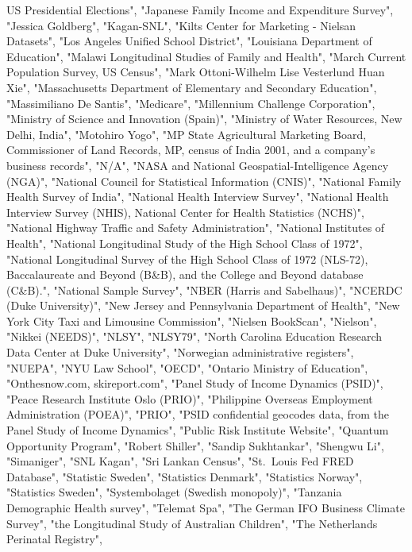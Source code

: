 \documentclass[]{article}
\begin{document}
\begin{itemize}
  US Presidential Elections", "Japanese Family Income and Expenditure
  Survey", "Jessica Goldberg", "Kagan-SNL", "Kilts Center for Marketing
  - Nielsan Datasets", "Los Angeles Unified School District", "Louisiana
  Department of Education", "Malawi Longitudinal Studies of Family and
  Health", "March Current Population Survey, US Census", "Mark
  Ottoni-Wilhelm Lise Vesterlund Huan Xie", "Massachusetts Department of
  Elementary and Secondary Education", "Massimiliano De Santis",
  "Medicare", "Millennium Challenge Corporation", "Ministry of Science
  and Innovation (Spain)", "Ministry of Water Resources, New Delhi,
  India", "Motohiro Yogo", "MP State Agricultural Marketing Board,
  Commissioner of Land Records, MP, census of India 2001, and a
  company's business records", "N/A", "NASA and National
  Geospatial-Intelligence Agency (NGA)", "National Council for
  Statistical Information (CNIS)", "National Family Health Survey of
  India", "National Health Interview Survey", "National Health Interview
  Survey (NHIS), National Center for Health Statistics (NCHS)",
  "National Highway Traffic and Safety Administration", "National
  Institutes of Health", "National Longitudinal Study of the High School
  Class of 1972", "National Longitudinal Survey of the High School Class
  of 1972 (NLS-72), Baccalaureate and Beyond (B\&B), and the College and
  Beyond database (C\&B).", "National Sample Survey", "NBER (Harris and
  Sabelhaus)", "NCERDC (Duke University)", "New Jersey and Pennsylvania
  Department of Health", "New York City Taxi and Limousine Commission",
  "Nielsen BookScan", "Nielson", "Nikkei (NEEDS)", "NLSY", "NLSY79",
  "North Carolina Education Research Data Center at Duke University",
  "Norwegian administrative registers", "NUEPA", "NYU Law School",
  "OECD", "Ontario Ministry of Education", "Onthesnow.com,
  skireport.com", "Panel Study of Income Dynamics (PSID)", "Peace
  Research Institute Oslo (PRIO)", "Philippine Overseas Employment
  Administration (POEA)", "PRIO", "PSID confidential geocodes data, from
  the Panel Study of Income Dynamics", "Public Risk Institute Website",
  "Quantum Opportunity Program", "Robert Shiller", "Sandip Sukhtankar",
  "Shengwu Li", "Simaniger", "SNL Kagan", "Sri Lankan Census",
  "St.~Louis Fed FRED Database", "Statistic Sweden", "Statistics
  Denmark", "Statistics Norway", "Statistics Sweden", "Systembolaget
  (Swedish monopoly)", "Tanzania Demographic Health survey", "Telemat
  Spa", "The German IFO Business Climate Survey", "the Longitudinal
  Study of Australian Children", "The Netherlands Perinatal Registry",

\end{itemize}
\end{document}
